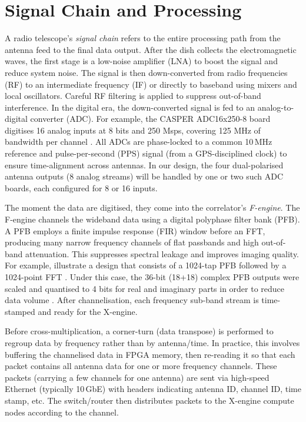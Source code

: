     \section{Signal Chain and Processing}
    A radio telescope’s \emph{signal chain} refers to the entire processing path from the antenna feed to the final data output. After the dish collects the electromagnetic waves, the first stage is a low-noise amplifier (LNA) to boost the signal and reduce system noise. The signal is then down-converted from radio frequencies (RF) to an intermediate frequency (IF) or directly to baseband using mixers and local oscillators. Careful RF filtering is applied to suppress out-of-band interference. In the digital era, the down-converted signal is fed to an analog-to-digital converter (ADC). For example, the CASPER ADC16x250-8 board digitises 16 analog inputs at 8 bits and 250 Msps, covering 125 MHz of bandwidth per channel \cite{Wang2024}. All ADCs are phase-locked to a common 10\,MHz reference and pulse-per-second (PPS) signal (from a GPS-disciplined clock) to ensure time-alignment across antennas. In our design, the four dual-polarised antenna outputs (8 analog streams) will be handled by one or two such ADC boards, each configured for 8 or 16 inputs. 
    
    The moment the data are digitised, they come into the correlator's \emph{F-engine}. The F-engine channels the wideband data using a digital polyphase filter bank (PFB). A PFB employs a finite impulse response (FIR) window before an FFT, producing many narrow frequency channels of flat passbands and high out-of-band attenuation. This suppresses spectral leakage and improves imaging quality. For example, \cite{Wang2024} illustrate a design that consists of a 1024-tap PFB followed by a 1024-point FFT \cite{Wang2024}. Under this case, the 36-bit (18+18) complex PFB outputs were scaled and quantised to 4 bits for real and imaginary parts in order to reduce data volume \cite{Wang2024}. After channelisation, each frequency sub-band stream is time-stamped and ready for the X-engine.
    
    Before cross-multiplication, a corner-turn (data transpose) is performed to regroup data by frequency rather than by antenna/time. In practice, this involves buffering the channelised data in FPGA memory, then re-reading it so that each packet contains all antenna data for one or more frequency channels. These packets (carrying a few channels for one antenna) are sent via high-speed Ethernet (typically 10\,GbE) with headers indicating antenna ID, channel ID, time stamp, etc. The switch/router then distributes packets to the X-engine compute nodes according to the channel. 
    
